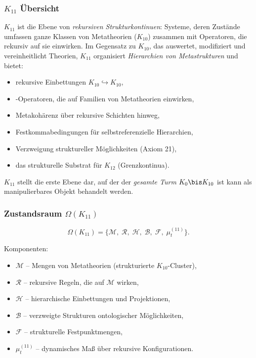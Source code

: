 

\subsubsection{$K_{11}$ Übersicht}
\label{sec:k11-overview}

$K_{11}$ ist die Ebene von \emph{rekursiven Strukturkontinuen}: Systeme, deren
Zustände umfassen ganze Klassen von Metatheorien ($K_{10}$) zusammen mit
Operatoren, die rekursiv auf sie einwirken. Im Gegensatz zu $K_{10}$, das auswertet,
modifiziert und vereinheitlicht Theorien, $K_{11}$ organisiert \emph{Hierarchien von
Metastrukturen} und bietet:
\begin{itemize}
    \item rekursive Einbettungen $K_{10}\hookrightarrow K_{10}$,
    \item-Operatoren, die auf Familien von Metatheorien einwirken,
    \item Metakohärenz über rekursive Schichten hinweg,
    \item Festkommabedingungen für selbstreferenzielle Hierarchien,
    \item Verzweigung struktureller Möglichkeiten (Axiom 21),
    \item das strukturelle Substrat für $K_{12}$ (Grenzkontinua).
\end{itemize}

$K_{11}$ stellt die erste Ebene dar, auf der der \emph{gesamte Turm} $K_0 \bis K_{10}$ ist
kann als manipulierbares Objekt behandelt werden.

\subsubsection{Zustandsraum $\Omega(K_{11})$}

\[
\Omega(K_{11})=
\{
\mathcal{M},\;
\mathcal{R},\;
\mathcal{H},\;
\mathcal{B},\;
\mathcal{F},\;
\mu^{(11)}_t
\}.
\]

Komponenten:
\begin{itemize}
    \item $\mathcal{M}$ – Mengen von Metatheorien (strukturierte $K_{10}$-Cluster),
    \item $\mathcal{R}$ – rekursive Regeln, die auf $\mathcal{M}$ wirken,
    \item $\mathcal{H}$ – hierarchische Einbettungen und Projektionen,
    \item $\mathcal{B}$ – verzweigte Strukturen ontologischer Möglichkeiten,
    \item $\mathcal{F}$ – strukturelle Festpunktmengen,
    \item $\mu^{(11)}_t$ – dynamisches Maß über rekursive Konfigurationen.
\end{itemize}

